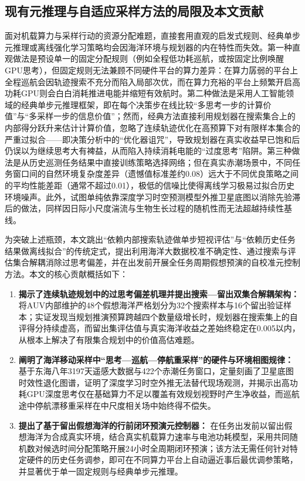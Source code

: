 \subsection{现有元推理与自适应采样方法的局限及本文贡献}

面对机载算力与采样行动的资源分配难题，直接套用直观的启发式规则、经典单步元推理或离线强化学习策略均会因海洋环境与规划器的内在特性而失效。第一种直观做法是预设单一的固定分配规则（例如全程低功耗巡航，或按固定比例唤醒GPU思考），但固定规则无法兼顾不同硬件平台的算力差异：在算力孱弱的平台上全程巡航会因轨迹搜索不充分而陷入局部次优，而在算力充裕的平台上频繁开启高功耗GPU则会白白消耗推进电能并缩短有效航时。第二种做法是采用人工智能领域的经典单步元推理框架\cite{horvitz1987reasoning, russell1991right, lin2015metareasoning, sung2021quit}，即在每个决策步在线比较“多思考一步的计算价值”与“多采样一步的信息价值”；然而，经典方法直接利用规划器在搜索集合上的内部得分跃升来估计计算价值，忽略了连续轨迹优化在高预算下对有限样本集合的严重过拟合——即决策分析中的“优化器诅咒”\cite{smith2006curse, vanhasselt2010double}，导致规划器在真实收益早已饱和后仍误以为继续思考大有裨益，从而陷入持续消耗电能的“过度思考”陷阱\cite{cuadron2025overthinking}。第三种做法是从历史巡测任务结果中直接训练策略选择网络\cite{magnino2026metareasoning}；但在真实赤潮场景中，不同任务窗口间的自然环境复杂度差异（遗憾值标准差约0.08）远大于不同优良策略之间的平均性能差距（通常不超过0.01），极低的信噪比使得离线学习极易过拟合历史环境噪声。此外，试图单纯依靠深度学习时空预测模型外推卫星底图以消除先验滞后的做法\cite{assran2025vjepa2}，同样因日际小尺度湍流与生物生长过程的随机性而无法超越持续性基线。

为突破上述瓶颈，本文跳出“依赖内部搜索轨迹做单步短视评估”与“依赖历史任务结果做离线拟合”的传统定式，提出利用海洋大数据校准不确定性、通过搜索与评估集合解耦消除过思考偏差，并在出发前开展全任务周期假想预演的自校准元控制方法。本文的核心贡献概括如下：
\begin{enumerate}
  \item \textbf{揭示了连续轨迹规划中的过思考偏差机理并提出搜索—留出双集合解耦架构：} 将AUV内部维护的48个假想海洋严格划分为32个搜索样本与16个留出验证样本；实证发现当规划推演预算跨越四个数量级增长时，规划器在搜索集上的自评得分持续虚高，而留出集评估值与真实海洋收益之差始终稳定在0.005以内，从根本上解决了有限集合规划中的价值高估难题。
  \item \textbf{阐明了海洋移动采样中“思考—巡航—停航重采样”的硬件与环境相图规律：} 基于东海八年3197天遥感大数据与422个赤潮任务窗口，定量刻画了卫星底图时效性退化图谱，证明了深度学习时空外推无法替代现场观测，并揭示出高功耗GPU深度思考仅在基础算力不足以覆盖有效规划视野时产生净收益，而巡航途中停航漂移重采样在中尺度相关场中始终得不偿失。
  \item \textbf{提出了基于留出假想海洋的行前闭环预演元控制器：} 在任务出发前以留出假想海洋为合成真实环境，结合真实机载算力速率与电池功耗模型，采用共同随机数对候选时间分配策略开展24小时全周期闭环预演；该方法无需任何针对特定硬件的历史任务调参，即可在不同算力平台上自动逼近事后最优调参策略，并显著优于单一固定规则与经典单步元推理。
\end{enumerate}

